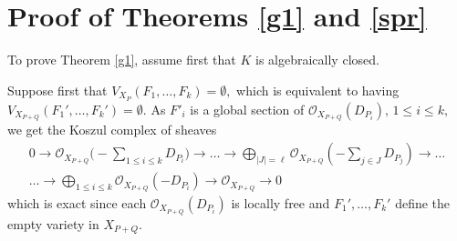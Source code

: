 \documentclass[a4paper,11pt]{amsart}
\newcommand{\cO}{{\mathcal O}}
\newcounter{thm}
\numberwithin{thm}{section}
\numberwithin{equation}{section}
\theoremstyle{definition}
\theoremstyle{plain}
\begin{document}
\bigskip
\section{Proof of Theorems \ref{g1} and \ref{spr}}\label{sec: proofthm1}

To prove Theorem \ref{g1}, assume first that $K$ is algebraically closed. \par
{}
Suppose first that $V_{X_{P}}(F_1,\ldots, F_k)=\emptyset,$ which is equivalent to  having  $V_{X_{P+Q}}(F_1',\ldots, F_k')=\emptyset.$
As $F'_i$ is a global section of $\cO_{X_{P+Q}}(D_{P_i}),\, 1\leq i\leq k,$ we get the Koszul complex of sheaves
 \begin{equation}\label{cx1}
\begin{array}{r}
0\to\cO_{X_{P+Q}}\big(-\sum_{1\leq i\leq k} D_{P_i}\big)\to \ldots \to\bigoplus_{|J|=\ell} \cO_{X_{P+Q}}(-\sum_{j\in J}D_{P_j})\to\ldots\\[2mm]
\dots \to\bigoplus_{1\leq i\leq k} \cO_{X_{P+Q}}(-D_{P_i})\to\cO_{X_{P+Q}}\to0
\end{array}
\end{equation}
which is exact since each $\cO_{X_{P+Q}}(D_{P_i})$ is locally free and $F_1',\ldots, F_k'$ define the empty variety in $X_{P+Q}.$
\end{document}
